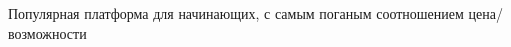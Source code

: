 \label{arduino}

Популярная платформа для начинающих, с самым поганым соотношением
цена/возможности
